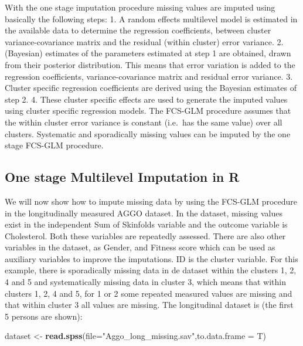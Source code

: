\documentclass[]{book}
\newenvironment{Shaded}{\begin{snugshade}}{\end{snugshade}}
\newcommand{\KeywordTok}[1]{\textcolor[rgb]{0.13,0.29,0.53}{\textbf{#1}}}
\newcommand{\DataTypeTok}[1]{\textcolor[rgb]{0.13,0.29,0.53}{#1}}
\newcommand{\StringTok}[1]{\textcolor[rgb]{0.31,0.60,0.02}{#1}}
\newcommand{\NormalTok}[1]{#1}
\begin{document}
With the one stage imputation procedure missing values are imputed using
basically the following steps: 1. A random effects multilevel model is
estimated in the available data to determine the regression
coefficients, between cluster variance-covariance matrix and the
residual (within cluster) error variance. 2. (Bayesian) estimates of the
parameters estimated at step 1 are obtained, drawn from their posterior
distribution. This means that error variation is added to the regression
coefficients, variance-covariance matrix and residual error variance. 3.
Cluster specific regression coefficients are derived using the Bayesian
estimates of step 2. 4. These cluster specific effects are used to
generate the imputed values using cluster specific regression models.
The FCS-GLM procedure assumes that the within cluster error variance is
constant (i.e.~has the same value) over all clusters. Systematic and
sporadically missing values can be imputed by the one stage FCS-GLM
procedure.

\subsection{One stage Multilevel Imputation in
R}\label{one-stage-multilevel-imputation-in-r}

We will now show how to impute missing data by using the FCS-GLM
procedure in the longitudinally measured AGGO dataset. In the dataset,
missing values exist in the independent Sum of Skinfolds variable and
the outcome variable is Cholesterol. Both these variables are repeatedly
assessed. There are also other variables in the dataset, as Gender, and
Fitness score which can be used as auxiliary variables to improve the
imputations. ID is the cluster variable. For this example, there is
sporadically missing data in de dataset within the clusters 1, 2, 4 and
5 and systematically missing data in cluster 3, which means that within
clusters 1, 2, 4 and 5, for 1 or 2 some repeated measured values are
missing and that within cluster 3 all values are missing. The
longitudinal dataset is (the first 5 persons are shown):

\begin{Shaded}
\begin{Highlighting}[]
\NormalTok{dataset <-}\StringTok{ }\KeywordTok{read.spss}\NormalTok{(}\DataTypeTok{file=}\StringTok{"Aggo_long_missing.sav"}\NormalTok{,}\DataTypeTok{to.data.frame =}\NormalTok{ T)}
\end{Highlighting}
\end{Shaded}
\end{document}
